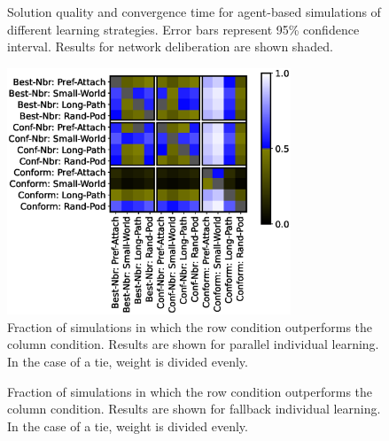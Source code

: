 \begin{figure}[]
\begin{minipage}{1.875in}
    \end{minipage}
\caption{
Solution quality and convergence time for agent-based simulations of different learning strategies. Error bars represent 95\% confidence interval. Results for network deliberation are shown shaded.
}
\end{figure}

\begin{figure}
    \label{fig:results-frac-parallel}
    \centering
    \includegraphics[width=3.33in]{fig/NetDelibABM/fig-result-frac-parallel.eps}
\caption{Fraction of simulations in which the row condition outperforms the column condition. Results are shown for parallel individual learning. In the case of a tie, weight is divided evenly.}
\end{figure}

\begin{figure}
    \label{fig:results-frac-fallback}
    \centering
\caption{Fraction of simulations in which the row condition outperforms the column condition. Results are shown for fallback individual learning. In the case of a tie, weight is divided evenly.}
\end{figure}

